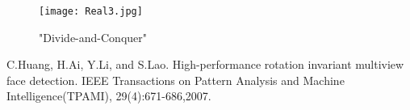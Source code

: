 \documentclass{article}
\begin{document}
        \begin{figure}[H]
            \centering
            \texttt{[image: Real3.jpg]}
            \caption{"Divide-and-Conquer"}
            \label{fig:3}
        \end{figure}
\begin{thebibliography}{99}
        C.Huang, H.Ai, Y.Li, and S.Lao. High-performance rotation invariant multiview face detection. IEEE Transactions on Pattern Analysis and Machine Intelligence(TPAMI), 29(4):671-686,2007.
\end{thebibliography}
\end{document}
